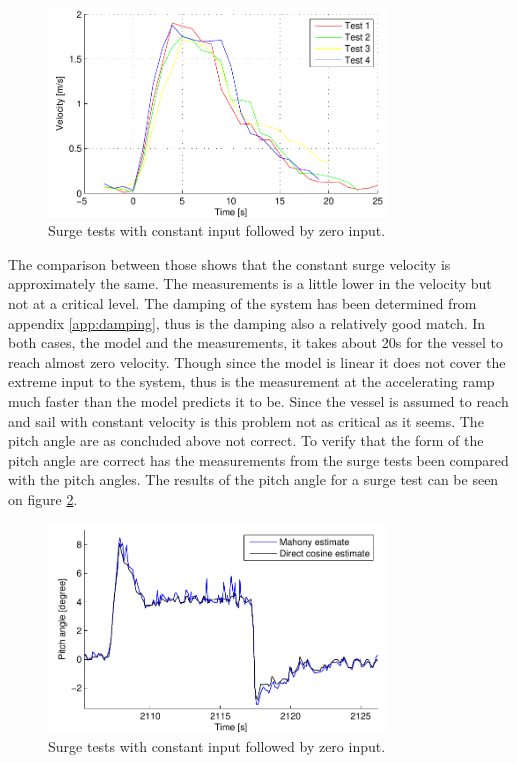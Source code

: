 \begin{figure}
  \centering
  \includegraphics[width=0.8\textwidth]{../../code/matlab/log-viewer/surgeverify}
  \caption{Surge tests with constant input followed by zero input.}
  \label{fig:surgeverify}
\end{figure}

The comparison between those shows that the constant surge velocity is approximately the same. The measurements is a little lower in the velocity but not at a critical level. The damping of the system has been determined from appendix \ref{app:damping}, thus is the damping also a relatively good match. In both cases, the model and the measurements, it takes about 20s for the vessel to reach almost zero velocity. Though since the model is linear it does not cover the extreme input to the system, thus is the measurement at the accelerating ramp much faster than the model predicts it to be. Since the vessel is assumed to reach and sail with constant velocity is this problem not as critical as it seems.
The pitch angle are as concluded above not correct. To verify that the form of the pitch angle are correct has the measurements from the surge tests been compared with the pitch angles. The results of the pitch angle for a surge test can be seen on figure \ref{fig:pitchverify}.

\begin{figure}
  \centering
  \includegraphics[width=0.8\textwidth]{../../code/matlab/log-viewer/pitchverify}
  \caption{Surge tests with constant input followed by zero input.}
  \label{fig:pitchverify}
\end{figure}

